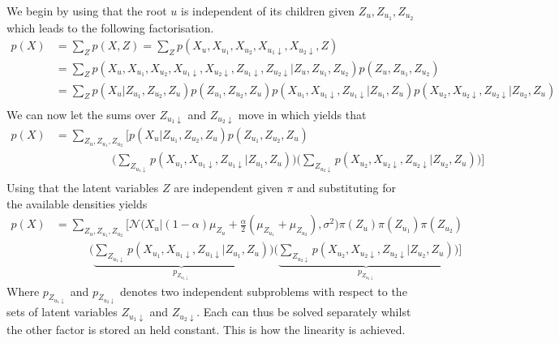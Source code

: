 We begin by using that the root $u$ is independent of its children given $Z_u, Z_{u_1}, Z_{u_2}$ which leads to the following factorisation.
\begin{align}
  p(X) & = \sum_Z p(X,Z) = \sum_Z p(X_u, X_{u_1}, X_{u_2}, X_{u_1\downarrow}, X_{u_2\downarrow}, Z) \nonumber \\
  & = \sum_Z p(X_u, X_{u_1}, X_{u_2}, X_{u_1\downarrow}, X_{u_2\downarrow}, Z_{u_1\downarrow}, Z_{u_2\downarrow}| Z_u, Z_{u_1}, Z_{u_2})p(Z_u, Z_{u_1}, Z_{u_2}) \nonumber\\
  & = \sum_Z p(X_u|Z_{u_1}, Z_{u_2}, Z_u) p(Z_{u_1}, Z_{u_2}, Z_u)
  p(X_{u_1}, X_{u_1 \downarrow}, Z_{u_1 \downarrow}|Z_{u_1}, Z_u)
  p(X_{u_2}, X_{u_2 \downarrow}, Z_{u_2 \downarrow}|Z_{u_2}, Z_u) \nonumber\\
\end{align}
We can now let the sums over $Z_{u_1 \downarrow}$ and $Z_{u_2 \downarrow}$ move in which yields that
\begin{align}
  p(X) & = \sum_{Z_u, Z_{u_1}, Z_{u_2}}\bigg[p(X_u|Z_{u_1}, Z_{u_2}, Z_u) p(Z_{u_1}, Z_{u_2}, Z_u) \nonumber\\
  & \qquad\qquad\quad \Big(\sum_{Z_{u_1 \downarrow}} p(X_{u_1}, X_{u_1 \downarrow}, Z_{u_1 \downarrow}|Z_{u_1}, Z_u) \Big)\Big(\sum_{Z_{u_2 \downarrow}} p(X_{u_2}, X_{u_2 \downarrow}, Z_{u_2 \downarrow}|Z_{u_2}, Z_u) \Big)\bigg] \nonumber \\
\end{align}
Using that the latent variables $Z$ are independent given $\pi$ and substituting for the available densities yields
\begin{align}
  p(X) & = \sum_{Z_u, Z_{u_1}, Z_{u_2}}\bigg[\mathcal{N}\Big(X_u|(1-\alpha)\mu_{Z_u} +\frac{\alpha}{2}(\mu_{Z_{u_1}}+\mu_{Z_{u_2}}), \sigma^2 \Big) \pi(Z_u) \pi(Z_{u_1}) \pi(Z_{u_2})\\
  & \qquad\quad
  \Big(\underbrace{\sum_{Z_{u_1 \downarrow}} p(X_{u_1}, X_{u_1 \downarrow}, Z_{u_1 \downarrow}|Z_{u_1}, Z_u)}_\text{$p_{Z_{u_1 \downarrow}}$} \Big)
  \Big(\underbrace{\sum_{Z_{u_2 \downarrow}} p(X_{u_2}, X_{u_2 \downarrow}, Z_{u_2 \downarrow}|Z_{u_2}, Z_u)}_\text{$p_{Z_{u_2 \downarrow}}$} \Big) \bigg]
\end{align}
Where $p_{Z_{u_1 \downarrow}}$ and $p_{Z_{u_2 \downarrow}}$ denotes two independent subproblems with respect to the sets of latent variables $Z_{u_1 \downarrow}$ and $Z_{u_2 \downarrow}$. Each can thus be solved separately whilst the other factor is stored an held constant. This is how the linearity is achieved.

